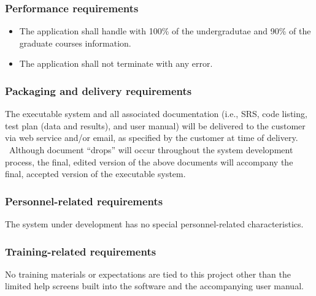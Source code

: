 \documentclass[twoside,letterpaper]{article}
\begin{document}
\subsubsection[Performance
requirements]{\rmfamily\bfseries\color{black}
Performance requirements}

\noindent\begin{itemize}
  \item The application shall handle with 100\% of the undergradutae and 90\% of the graduate courses information.
  \item The application shall not terminate with any error.
\end{itemize}

\subsubsection[Packaging and delivery
requirements]{\rmfamily\bfseries\color{black}
Packaging and delivery requirements}

{\color{black}
The executable system and all associated documentation (i.e., SRS,
code listing, test plan (data and results), and user manual) will be
delivered to the customer via web service and/or email, as
specified by the customer at time of delivery. \ Although document
{\textquotedblleft}drops{\textquotedblright} will occur throughout the
system development process, the final, edited version of the above
documents will accompany the final, accepted version of the executable
system.}

\subsubsection[Personnel{}-related
requirements]{\rmfamily\bfseries\color{black}
Personnel-related requirements}

{\color{black}
The system under development has no special personnel-related
characteristics. }

\subsubsection[Training{}-related
requirements]{\rmfamily\bfseries\color{black}
Training-related requirements}

{\color{black}
No training materials or expectations are tied to this project other
than the limited help screens built into the software and the
accompanying user manual.}
\end{document}
